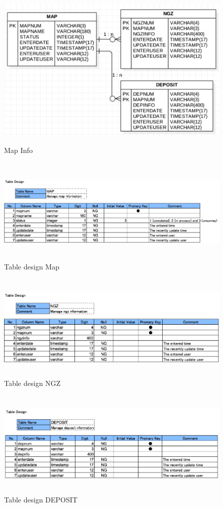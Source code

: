 \documentclass[11pt, a4paper]{article}
\begin{document}
\begin{figure}[H]
\centering
\includegraphics[height=3in]{MI}
\caption[Map Info]{Map Info}
\end{figure}

\begin{figure}[H]
\centering
\includegraphics[height=2in]{DM}
\caption[Table design Map]{Table design Map}
\end{figure}

\begin{figure}[H]
\centering
\includegraphics[height=2in]{NGZ}
\caption[Table design NGZ]{Table design NGZ}
\end{figure}

\begin{figure}[H]
\centering
\includegraphics[height=2in]{DE}
\caption[TTable design DEPOSIT]{Table design DEPOSIT}
\end{figure}
\end{document}
